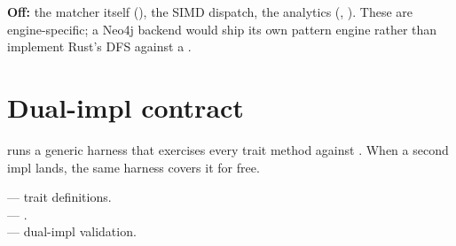 \textbf{Off:} the matcher itself (),
the SIMD dispatch, the analytics (,
). These are engine-specific; a Neo4j backend
would ship its own pattern engine rather than implement Rust's DFS
against a .

\section{Dual-impl contract}

 runs a
generic  harness that
exercises every trait method against
. When a second impl lands, the same harness
covers it for free.

\begin{inthecode}
 --- trait
definitions.\\
 ---
.\\
 ---
dual-impl validation.
\end{inthecode}
